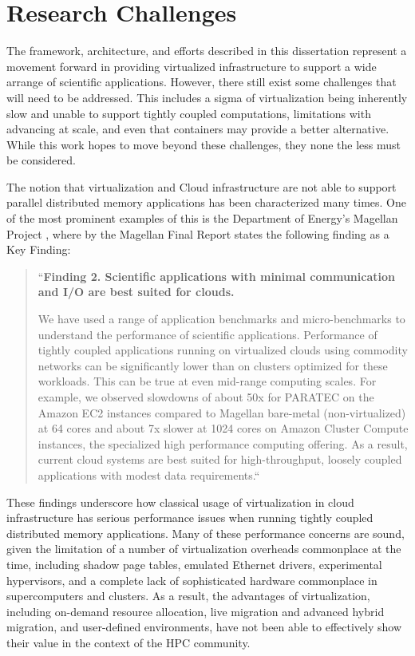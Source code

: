 \section{Research Challenges}
\label{sec:chall}

The framework, architecture, and efforts described in this dissertation represent a movement forward in providing virtualized infrastructure to support a wide arrange of scientific applications. However, there still exist some challenges that will need to be addressed.  This includes a sigma of virtualization being inherently slow and unable to support tightly coupled computations, limitations with advancing at scale, and even that containers may provide a better alternative.  While this work hopes to move beyond these challenges, they none the less must be considered. 

The notion that virtualization and Cloud infrastructure are not able to support parallel distributed memory applications has been characterized many times. One of the most prominent examples of this is the Department of Energy's Magellan Project \cite{www-magellan}, where by the Magellan Final Report \cite{MagellanFinal} states the following finding as a Key Finding:
  
\begin{quote}
``\textbf{Finding 2. Scientific applications with minimal communication and I/O are best suited for clouds.}

We have used a range of application benchmarks and micro-benchmarks to understand the performance of scientific applications. Performance of tightly coupled applications running on virtualized clouds using commodity networks can be significantly lower than on clusters optimized for these workloads. This can be true at even mid-range computing scales. For example, we observed slowdowns of about 50x for PARATEC on the Amazon EC2 instances compared to Magellan bare-metal (non-virtualized) at 64 cores and about 7x slower at 1024 cores on Amazon Cluster Compute instances, the specialized high performance computing offering. As a result, current cloud systems are best suited for high-throughput, loosely coupled applications with modest data requirements.``
\end{quote}

These findings underscore how classical usage of virtualization in cloud infrastructure has serious performance issues when running tightly coupled distributed memory applications. Many of these performance concerns are sound, given the limitation of a number of virtualization overheads commonplace at the time, including shadow page tables, emulated Ethernet drivers, experimental hypervisors, and a complete lack of sophisticated hardware commonplace in supercomputers and clusters.  As a result, the advantages of virtualization, including on-demand resource allocation, live migration and advanced hybrid migration, and user-defined environments, have not been able to effectively show their value in the context of the HPC community.

